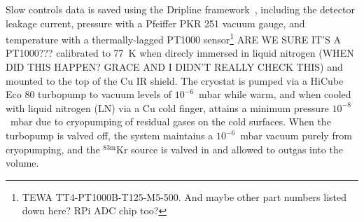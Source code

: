 \documentclass[nofootinbib,superscriptaddress, aps, prc, 
10pt, amsmath, amssymb, bibnotes,
altaffilletter, twocolumn, floatfix]{revtex4-2}
\def\kr83{{${}^{83\mathrm{m}}$Kr}}
\begin{document}
    Slow controls data is saved using the Dripline framework~\cite{laroque2022dripline}, including the detector leakage current, pressure with a Pfeiffer PKR 251 vacuum gauge, and temperature with a thermally-lagged PT1000 sensor\footnote{TEWA TT4-PT1000B-T125-M5-500.   And maybe other part numbers listed down here?  RPi ADC chip too?} ARE WE SURE IT'S A PT1000??? calibrated to 77~K when direcly immersed in liquid nitrogen (WHEN DID THIS HAPPEN? GRACE AND I DIDN'T REALLY CHECK THIS) and mounted to the top of the Cu IR shield.
    The cryostat is pumped via a HiCube Eco 80 turbopump to vacuum levels of $10^{-6}$~mbar while warm, and when cooled with liquid nitrogen (LN) via a Cu cold finger, attains a minimum pressure $10^{-8}$~mbar due to cryopumping of residual gases on the cold surfaces.
    When the turbopump is valved off, the system maintains a $10^{-6}$~mbar vacuum purely from cryopumping, and the \kr83 source is valved in and allowed to outgas into the volume.
\end{document}
